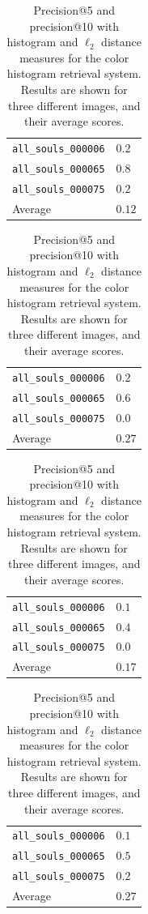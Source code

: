 \documentclass[a4paper,10pt,twoside]{article}
\begin{document}
\begin{table}
  \begin{subtable}{0.47\textwidth}
    \begin{tabular}{l|l}
      \texttt{all\_souls\_000006} & $0.2$ \\
      \texttt{all\_souls\_000065} & $0.8$ \\
      \texttt{all\_souls\_000075} & $0.2$ \\
      \hline
      Average                     & $0.12$ \\
    \end{tabular}
    \caption{Precision@5, histogram distance.}
    \label{tab:color_p5h}
  \end{subtable}
  \hspace*{\fill}
  \begin{subtable}{0.47\textwidth}
    \begin{tabular}{l|l}
      \texttt{all\_souls\_000006} & $0.2$ \\
      \texttt{all\_souls\_000065} & $0.6$ \\
      \texttt{all\_souls\_000075} & $0.0$ \\
      \hline
      Average                     & $0.27$ \\
    \end{tabular}
    \caption{Precision@5, $\ell_2$ distance.}
    \label{tab:color_p5l}
  \end{subtable}
  \begin{subtable}{0.47\textwidth}
    \begin{tabular}{l|l}
      \texttt{all\_souls\_000006} & $0.1$ \\
      \texttt{all\_souls\_000065} & $0.4$ \\
      \texttt{all\_souls\_000075} & $0.0$ \\
      \hline
      Average                     & $0.17$ \\
    \end{tabular}
    \caption{Precision@10, histogram distance.}
    \label{tab:color_p10h}
  \end{subtable}
  \hspace*{\fill}
  \begin{subtable}{0.47\textwidth}
    \begin{tabular}{l|l}
      \texttt{all\_souls\_000006} & $0.1$ \\
      \texttt{all\_souls\_000065} & $0.5$ \\
      \texttt{all\_souls\_000075} & $0.2$ \\
      \hline
      Average                     & $0.27$ \\
    \end{tabular}
    \caption{Precision@10, $\ell_2$ distance.}
    \label{tab:color_p10l}
  \end{subtable}
  \caption{Precision@5 and precision@10 with histogram and $\ell_2$ distance measures for the color histogram retrieval system.  Results are shown for three different images, and their average scores.}
  \label{tab:color_precision}
\end{table}
\end{document}
